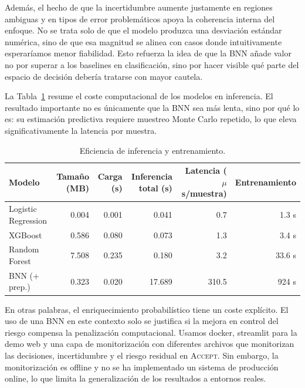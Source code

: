 \documentclass{article}
\begin{document}
Además, el hecho de que la incertidumbre aumente justamente en regiones ambiguas y en tipos de error problemáticos apoya la coherencia interna del enfoque. No se trata solo de que el modelo produzca una desviación estándar numérica, sino de que esa magnitud se alinea con casos donde intuitivamente esperaríamos menor fiabilidad. Esto refuerza la idea de que la BNN añade valor no por superar a los baselines en clasificación, sino por hacer visible qué parte del espacio de decisión debería tratarse con mayor cautela.

\FloatBarrier

La Tabla~\ref{tab:efficiency} resume el coste computacional de los modelos en inferencia. El resultado importante no es únicamente que la BNN sea más lenta, sino por qué lo es: su estimación predictiva requiere muestreo Monte Carlo repetido, lo que eleva significativamente la latencia por muestra.

\begin{table}[!htbp]
    \centering
    \small
    \caption{Eficiencia de inferencia y entrenamiento.}
    \label{tab:efficiency}
    \begin{tabular}{lrrrrr}
        \toprule
        Modelo              & Tamaño (MB) & Carga (s) & Inferencia total (s) & Latencia ($\mu$s/muestra) & Entrenamiento \\
        \midrule
        Logistic Regression & 0.004       & 0.001     & 0.041                & 0.7                       & 1.3 s         \\
        XGBoost             & 0.586       & 0.080     & 0.073                & 1.3                       & 3.4 s         \\
        Random Forest       & 7.508       & 0.235     & 0.180                & 3.2                       & 33.6 s        \\
        BNN (+ prep.)       & 0.323       & 0.020     & 17.689               & 310.5                     & 924 s         \\
        \bottomrule
    \end{tabular}
\end{table}

En otras palabras, el enriquecimiento probabilístico tiene un coste explícito. El uso de una BNN en este contexto solo se justifica si la mejora en control del riesgo compensa la penalización computacional. Usamos docker, streamlit para la demo web y una capa de monitorización con diferentes archivos que monitorizan las decisiones, incertidumbre y el riesgo residual en \textsc{Accept}. Sin embargo, la monitorización es offline y no se ha implementado un sistema de producción online, lo que limita la generalización de los resultados a entornos reales.
\end{document}
